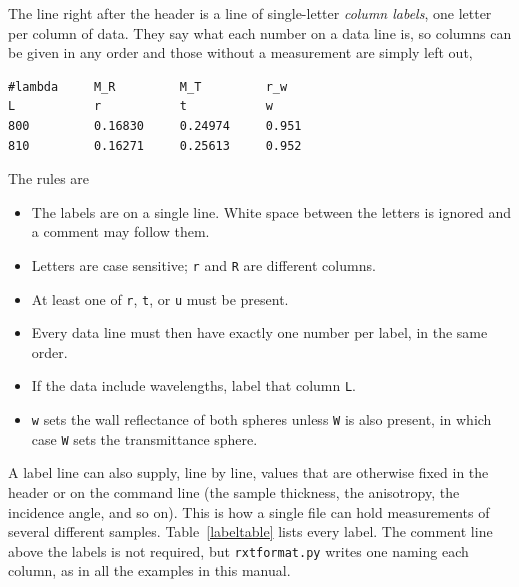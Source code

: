 \documentclass{article}
\begin{document}
The line right after the header is a line of single-letter \emph{column
labels}, one letter per column of data.  They say what each number on a data
line is, so columns can be given in any order and those without a
measurement are simply left out,
\begin{center}
\begin{minipage}{6cm}
\scriptsize
\begin{verbatim}
#lambda     M_R         M_T         r_w
L           r           t           w
800         0.16830     0.24974     0.951
810         0.16271     0.25613     0.952
\end{verbatim}
\end{minipage}
\end{center}
The rules are
\begin{itemize}
\item The labels are on a single line.  White space between the letters is
ignored and a comment may follow them.
\item Letters are case sensitive; \texttt{r} and \texttt{R} are different columns.
\item At least one of \texttt{r}, \texttt{t}, or \texttt{u} must be present.
\item Every data line must then have exactly one number per label, in the same order.
\item If the data include wavelengths, label that column \texttt{L}.
\item \texttt{w} sets the wall reflectance of both spheres unless \texttt{W}
is also present, in which case \texttt{W} sets the transmittance sphere.
\end{itemize}
A label line can also supply, line by line, values that are otherwise fixed
in the header or on the command line (the sample thickness, the anisotropy,
the incidence angle, and so on).  This is how a single file can hold
measurements of several different samples.  Table~\ref{labeltable} lists
every label.  The comment line above the labels is not required, but
\texttt{rxtformat.py} writes one naming each column, as in all the examples
in this manual.
\end{document}
